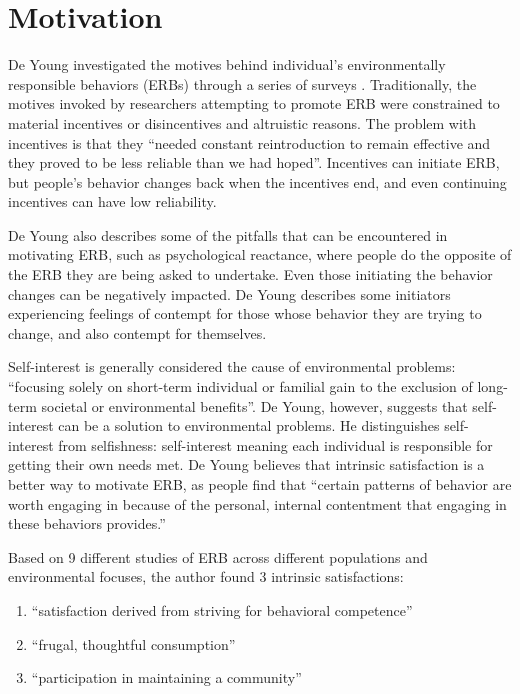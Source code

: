 \section{Motivation}

De Young investigated the motives behind individual's environmentally responsible behaviors (ERBs) through a series of surveys \cite{Young:2000fv}. Traditionally, the motives invoked by researchers attempting to promote ERB were constrained to material incentives or disincentives and altruistic reasons. The problem with incentives is that they ``needed constant reintroduction to remain effective and they proved to be less reliable than we had hoped''. Incentives can initiate ERB, but people's behavior changes back when the incentives end, and even continuing incentives can have low reliability.

De Young also describes some of the pitfalls that can be encountered in motivating ERB, such as psychological reactance, where people do the opposite of the ERB they are being asked to undertake. Even those initiating the behavior changes can be negatively impacted. De Young describes some initiators experiencing feelings of contempt for those whose behavior they are trying to change, and also contempt for themselves.

Self-interest is generally considered the cause of environmental problems: ``focusing solely on short-term individual or familial gain to the exclusion of long-term societal or environmental benefits''. De Young, however, suggests that self-interest can be a solution to environmental problems. He distinguishes self-interest from selfishness: self-interest meaning each individual is responsible for getting their own needs met. De Young believes that intrinsic satisfaction is a better way to motivate ERB, as people find that ``certain patterns of behavior are worth engaging in because of the personal, internal contentment that engaging in these behaviors provides.''

Based on 9 different studies of ERB across different populations and environmental focuses, the author found 3 intrinsic satisfactions:
\begin{enumerate}
	\item ``satisfaction derived from striving for behavioral competence''
	\item ``frugal, thoughtful consumption''
	\item ``participation in maintaining a community''
\end{enumerate}

